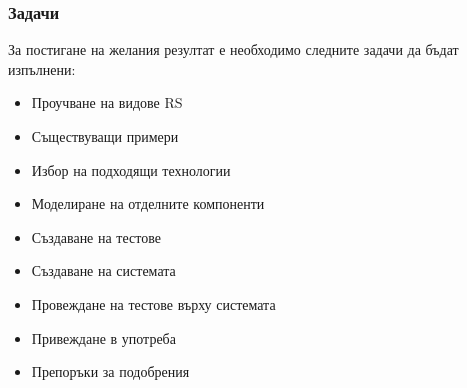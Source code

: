 	\subsubsection{Задачи}
		
		За постигане на желания резултат е необходимо следните задачи да бъдат изпълнени:	
	
		\begin{itemize}
			\item Проучване на видове \ac{RS}
			\item Съществуващи примери
			\item Избор на подходящи технологии
			\item Моделиране на отделните компоненти
			\item Създаване на тестове
			\item Създаване на системата
			\item Провеждане на тестове върху системата
			\item Привеждане в употреба
			\item Препоръки за подобрения
		\end{itemize}